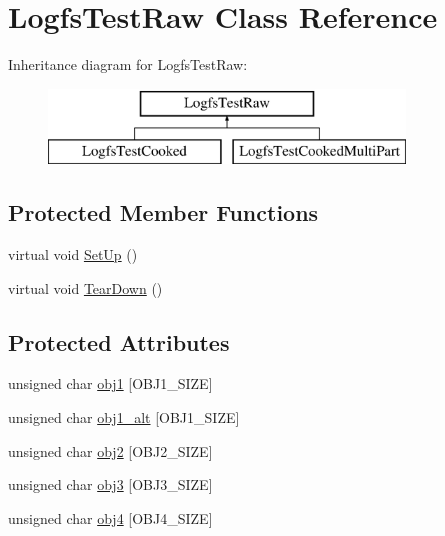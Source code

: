 \hypertarget{class_logfs_test_raw}{\section{\-Logfs\-Test\-Raw \-Class \-Reference}
\label{class_logfs_test_raw}
}
\-Inheritance diagram for \-Logfs\-Test\-Raw\-:\begin{figure}[H]
\begin{center}
\leavevmode
\includegraphics[height=2.000000cm]{class_logfs_test_raw}
\end{center}
\end{figure}
\subsection*{\-Protected \-Member \-Functions}
\begin{DoxyCompactItemize}
\item 
virtual void \hyperlink{group___unit_tests_ga6ad4da1f7c409b092a28457c4841e361}{\-Set\-Up} ()
\item 
virtual void \hyperlink{group___unit_tests_ga14c567025394faab5c7628decc578f1f}{\-Tear\-Down} ()
\end{DoxyCompactItemize}
\subsection*{\-Protected \-Attributes}
\begin{DoxyCompactItemize}
\item 
unsigned char \hyperlink{group___unit_tests_ga9a310807ae65fdb582ace246798d9112}{obj1} \mbox{[}\-O\-B\-J1\-\_\-\-S\-I\-Z\-E\mbox{]}
\item 
unsigned char \hyperlink{group___unit_tests_gab4d553b9c4a87a6f45e032b57f98a751}{obj1\-\_\-alt} \mbox{[}\-O\-B\-J1\-\_\-\-S\-I\-Z\-E\mbox{]}
\item 
unsigned char \hyperlink{group___unit_tests_ga8ed143a62924cbb11a0150f51b0f39e9}{obj2} \mbox{[}\-O\-B\-J2\-\_\-\-S\-I\-Z\-E\mbox{]}
\item 
unsigned char \hyperlink{group___unit_tests_gae2971f4ef641d737044260c4f11c1ba0}{obj3} \mbox{[}\-O\-B\-J3\-\_\-\-S\-I\-Z\-E\mbox{]}
\item 
unsigned char \hyperlink{group___unit_tests_ga538292c7d3fd8ffe5a32cc8b7e43d51c}{obj4} \mbox{[}\-O\-B\-J4\-\_\-\-S\-I\-Z\-E\mbox{]}
\end{DoxyCompactItemize}


